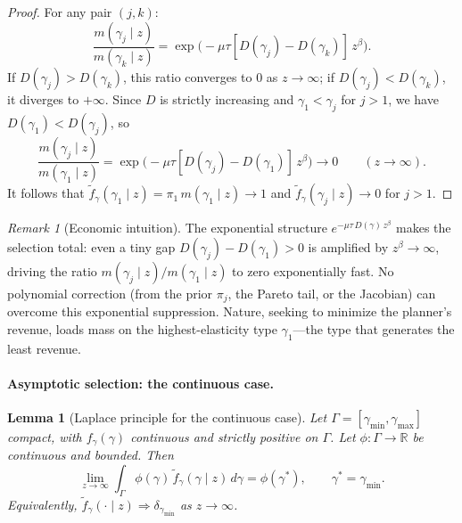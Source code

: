\documentclass[12pt,a4paper]{article}
\theoremstyle{definition}
\theoremstyle{plain}
\newtheorem{lemma}{Lemma}[section]
\theoremstyle{remark}
\newtheorem{remark}{Remark}[section]
\newcommand{\R}{\mathbb{R}}
\begin{document}
\begin{proof}
For any pair $(j,k)$:
\[
  \frac{m(\gamma_j \mid z)}{m(\gamma_k \mid z)} = \exp\!\bigl(-\mu\tau[D(\gamma_j) - D(\gamma_k)]\,z^{\beta}\bigr).
\]
If $D(\gamma_j) > D(\gamma_k)$, this ratio converges to $0$ as $z \to \infty$; if $D(\gamma_j) < D(\gamma_k)$, it diverges to $+\infty$.  Since $D$ is strictly increasing and $\gamma_1 < \gamma_j$ for $j > 1$, we have $D(\gamma_1) < D(\gamma_j)$, so
\[
  \frac{m(\gamma_j \mid z)}{m(\gamma_1 \mid z)} = \exp\!\bigl(-\mu\tau[D(\gamma_j) - D(\gamma_1)]\,z^{\beta}\bigr) \to 0 \qquad (z \to \infty).
\]
It follows that $\widetilde{f}_{\gamma}(\gamma_1 \mid z) = \pi_1\,m(\gamma_1 \mid z) \to 1$ and $\widetilde{f}_{\gamma}(\gamma_j \mid z) \to 0$ for $j > 1$.
\end{proof}

\begin{remark}[Economic intuition]
\label{rem:discrete_intuition_2D}
The exponential structure $e^{-\mu\tau\,D(\gamma)\,z^{\beta}}$ makes the selection total: even a tiny gap $D(\gamma_j) - D(\gamma_1) > 0$ is amplified by $z^{\beta} \to \infty$, driving the ratio $m(\gamma_j \mid z)/m(\gamma_1 \mid z)$ to zero exponentially fast.  No polynomial correction (from the prior $\pi_j$, the Pareto tail, or the Jacobian) can overcome this exponential suppression.  Nature, seeking to minimize the planner's revenue, loads mass on the highest-elasticity type $\gamma_1$---the type that generates the least revenue.
\end{remark}

\paragraph{Asymptotic selection: the continuous case.}

\begin{lemma}[Laplace principle for the continuous case]
\label{lem:laplace_2D}
Let $\Gamma = [\gamma_{\min},\gamma_{\max}]$ compact, with $f_{\gamma}(\gamma)$ continuous and strictly positive on $\Gamma$.  Let $\phi: \Gamma \to \R$ be continuous and bounded.  Then
\[
  \lim_{z \to \infty} \int_{\Gamma} \phi(\gamma)\,\widetilde{f}_{\gamma}(\gamma \mid z)\,d\gamma = \phi(\gamma^*), \qquad \gamma^* = \gamma_{\min}.
\]
Equivalently, $\widetilde{f}_{\gamma}(\cdot \mid z) \Rightarrow \delta_{\gamma_{\min}}$ as $z \to \infty$.
\end{lemma}
\end{document}
